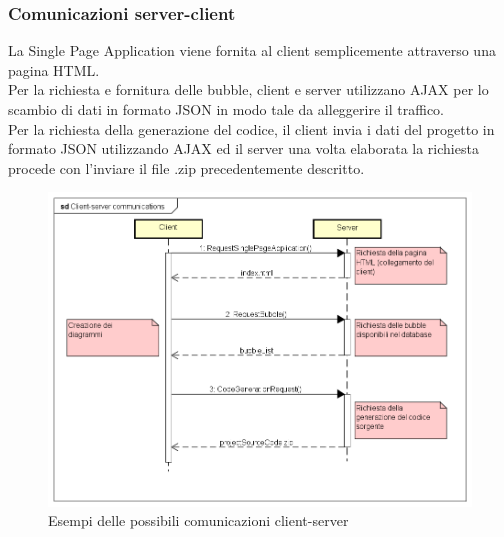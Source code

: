 \documentclass[../DefinizioneDiProdotto.tex]{subfiles}
\begin{document}
				\subsubsection{Comunicazioni server-client}
					La Single Page Application viene fornita al client semplicemente attraverso una
					pagina HTML.\\
					Per la richiesta e fornitura delle bubble, client e server utilizzano AJAX per lo
					scambio di dati in formato JSON in modo tale da alleggerire il traffico.\\
					Per la richiesta della generazione del codice, il client invia i dati del progetto
					in formato JSON utilizzando AJAX ed il server una volta elaborata la richiesta procede
					con l'inviare il file .zip precedentemente descritto.
					\begin{figure}[H] \label{fig:ClientServerCommunications}
						\centering
						\includegraphics[scale=0.4]{Immagini/ClientServerCommunications.png}
						\caption{Esempi delle possibili comunicazioni client-server}
					\end{figure}
	
\end{document}
